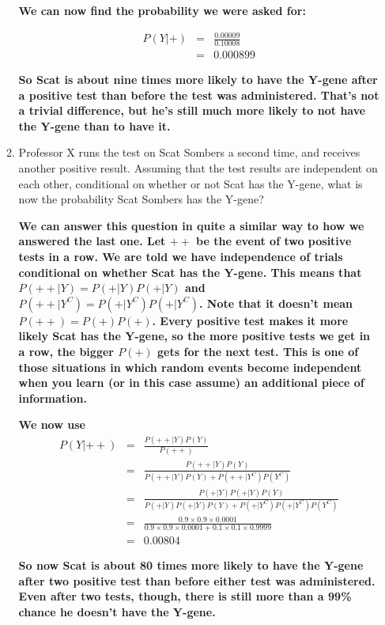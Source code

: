 \documentclass[11pt,a4paper]{article}
\begin{document}
\begin{enumerate}
\begin{enumerate}
\textbf{We can now find the probability we were asked for:}

\textbf{
\begin{eqnarray*}
P(Y|+)&=&\frac{0.00009}{0.10008}\\
&=& 0.000899
\end{eqnarray*}
}

\textbf{So Scat is about nine times more likely to have the Y-gene after a positive test than before the test was administered. That's not a trivial difference, but he's still much more likely to not have the Y-gene than to have it.}

\item Professor X runs the test on Scat Sombers a second time, and receives another positive result. Assuming that the test results are independent on each other, conditional on whether or not Scat has the Y-gene, what is now the probability Scat Sombers has the Y-gene?

\textbf{We can answer this question in quite a similar way to how we answered the last one. Let $++$ be the event of two positive tests in a row. We are told we have independence of trials conditional on whether Scat has the Y-gene. This means that $P(++|Y)=P(+|Y)P(+|Y)$ and $P(++|Y^C)=P(+|Y^C)P(+|Y^C)$. Note that it \textbf{doesn't} mean $P(++)=P(+)P(+)$. Every positive test makes it more likely Scat has the Y-gene, so the more positive tests we get in a row, the bigger $P(+)$ gets for the next test. This is one of those situations in which random events become independent when you learn (or in this case assume) an additional piece of information.}


\textbf{We now use}
\textbf{
\begin{eqnarray*}
P(Y|++)&=&\frac{P(++|Y)P(Y)}{P(++)}\\
&=&\frac{P(++|Y)P(Y)}{P(++|Y)P(Y)+P(++|Y^C)P(Y^C)}\\
&=&\frac{P(+|Y)P(+|Y)P(Y)}{P(+|Y)P(+|Y)P(Y)+P(+|Y^C)P(+|Y^C)P(Y^C)}\\
&=&\frac{0.9\times0.9\times 0.0001}{0.9\times0.9\times 0.0001+0.1\times0.1\times0.9999}\\
&=&0.00804
\end{eqnarray*}
}

\textbf{So now Scat is about 80 times more likely to have the Y-gene after two positive test than before either test was administered. Even after two tests, though, there is still more than a 99\% chance he doesn't have the Y-gene.}


\end{enumerate}

\end{enumerate}
\end{document}
